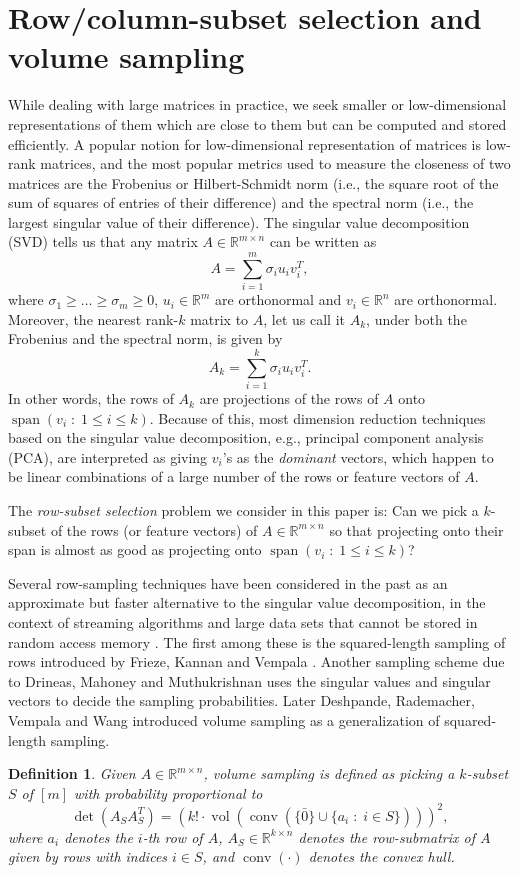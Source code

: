 \documentclass[11pt]{article}
\newtheorem{definition}[theorem]{Definition}
\def\reals{\mathbb{R}}
\def\suchthat{\;:\;}
\newcommand{\deter}[1]{\operatorname{det}\left(#1\right)}
\newcommand{\linspan}[1]{\operatorname{span}\left(#1\right)}
\newcommand{\vol}[1]{\operatorname{vol}\left(#1\right)}
\newcommand{\conv}[1]{\operatorname{conv}\left(#1\right)}
\begin{document}
\section{Row/column-subset selection and volume sampling}
While dealing with large matrices in practice, we seek smaller or low-dimensional representations of them which are close to them but can be computed and stored efficiently. A popular notion for low-dimensional representation of matrices is low-rank matrices, and the most popular metrics used to measure the closeness of two matrices are the Frobenius or Hilbert-Schmidt norm (i.e., the square root of the sum of squares of entries of their difference) and the spectral norm (i.e., the largest singular value of their difference). The singular value decomposition (SVD) tells us that any matrix $A \in \reals^{m \times n}$ can be written as
\[
A = \sum_{i=1}^{m} \sigma_{i} u_{i} v_{i}^{T},
\]
where $\sigma_{1} \geq \dotsc \geq \sigma_{m} \geq 0$, $u_{i} \in \reals^{m}$ are orthonormal and $v_{i} \in \reals^{n}$ are orthonormal. Moreover, the nearest rank-$k$ matrix to $A$, let us call it $A_{k}$, under both the Frobenius and the spectral norm, is given by
\[
A_{k} = \sum_{i=1}^{k} \sigma_{i} u_{i} v_{i}^{T}.
\]
In other words, the rows of $A_{k}$ are projections of the rows of $A$ onto $\linspan{v_{i} \suchthat 1 \leq i \leq k}$. Because of this, most dimension reduction techniques based on the singular value decomposition, e.g., principal component analysis (PCA), are interpreted as giving $v_{i}$'s as the \emph{dominant} vectors, which happen to be linear combinations of a large number of the rows or feature vectors of $A$.

The \emph{row-subset selection} problem we consider in this paper is: Can we pick a $k$-subset of the rows (or feature vectors) of $A \in \reals^{m \times n}$ so that projecting onto their span is almost as good as projecting onto $\linspan{v_{i} \suchthat 1 \leq i \leq k}$?

Several row-sampling techniques have been considered in the past as an approximate but faster alternative to the singular value decomposition, in the context of streaming algorithms and large data sets that cannot be stored in random access memory \cite{FKV,DMM,DRVW}. The first among these is the squared-length sampling of rows introduced by Frieze, Kannan and Vempala \cite{FKV}. Another sampling scheme due to Drineas, Mahoney and Muthukrishnan \cite{DMM} uses the singular values and singular vectors to decide the sampling probabilities. Later Deshpande, Rademacher, Vempala and Wang \cite{DRVW} introduced volume sampling as a generalization of squared-length sampling.
\begin{definition} \label{def:vol-sampling}
Given $A \in \reals^{m \times n}$, volume sampling is defined as picking a $k$-subset $S$ of $[m]$ with probability proportional to
\[
\deter{A_{S} A_{S}^{T}} = \left(k! \cdot \vol{\conv{\{\bar{0}\} \cup \{a_{i} \suchthat i \in S\}}}\right)^{2},
\]
where $a_{i}$ denotes the $i$-th row of $A$, $A_{S} \in \reals^{k \times n}$ denotes the row-submatrix of $A$ given by rows with indices $i \in S$, and $\conv{\cdot}$ denotes the convex hull.
\end{definition}
\end{document}
